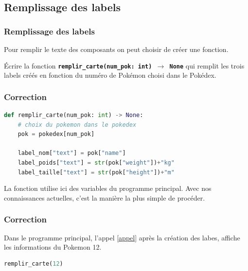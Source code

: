 \documentclass[svgnames,11pt]{beamer}
\begin{document}
\subsection{Remplissage des labels}
\begin{frame}
    \frametitle{Remplissage des labels}

    Pour remplir le texte des composants on peut choisir de créer une fonction.
    \begin{activite}
        Écrire la fonction \textbf{\texttt{remplir\_carte(num\_pok: int) $\rightarrow$ None}} qui remplit les trois labels créés en fonction du numéro de Pokémon choisi dans le Pokédex.
    \end{activite}
\end{frame}
\begin{frame}[fragile]
    \frametitle{Correction}
    \begin{center}
        \begin{lstlisting}[language=Python, basicstyle=\small]
def remplir_carte(num_pok: int) -> None:
    # choix du pokemon dans le pokedex
    pok = pokedex[num_pok]

    label_nom["text"] = pok["name"]
    label_poids["text"] = str(pok["weight"])+"kg"
    label_taille["text"] = str(pok["height"])+"m"
\end{lstlisting}
        \label{CODE}
    \end{center}

    \begin{aretenir}[Commentaire]
        La fonction utilise ici des variables du programme principal. Avec nos connaissances actuelles, c'est la manière la plus simple de procéder.
    \end{aretenir}
\end{frame}
\begin{frame}[fragile]
    \frametitle{Correction}

    Dans le programme principal, l'appel \ref{appel} après la création des labes, affiche les informations du Pokemon 12.

    \begin{center}
        \begin{lstlisting}[language=Python, basicstyle=\small]
remplir_carte(12)
\end{lstlisting}
        \label{appel}
    \end{center}

\end{frame}
\end{document}
